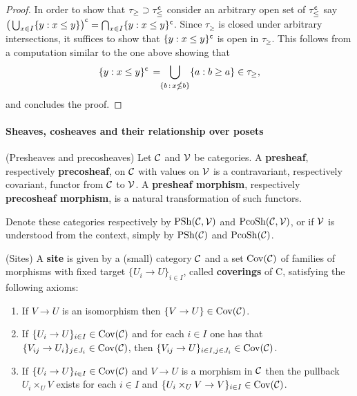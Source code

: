 \documentclass[main.tex]{subfiles}
\begin{document}
\begin{lemma}
\begin{proof}
In order to show that $\tau_\geq\supset\tau_{\leq}^{\mathsf{c}}$ consider an arbitrary open set of $\tau_{\leq}^{\mathsf{c}}$ say $\big(\bigcup_{x\in I}\{y:x\leq y\}\big)^{\mathsf{c}}=\bigcap_{x\in I}\{y:x\leq y\}^{\mathsf{c}}$. Since $\tau_\geq$ is closed under arbitrary intersections, it suffices to show that $\{y:x\leq y\}^{\mathsf{c}}$ is open in $\tau_\geq$. This follows from a computation similar to the one above showing that
\begin{equation*}
\{y:x\leq y\}^\c\,=\!\!\bigcup_{\{b\,:\,x\nleq b\}}\{a:b\geq a\}\in\tau_\geq, \vspace*{-8pt}
\end{equation*}
and concludes the proof.
\end{proof}
\end{lemma}

\paragraph{Sheaves, cosheaves and their relationship over posets}

\begin{definition}(Presheaves and precosheaves)
Let $\operatorname{\mathcal{C}}$ and $\operatorname{\mathcal{V}}$ be categories. A \textbf{presheaf}, respectively \textbf{precosheaf}, on $\operatorname{\mathcal{C}}$ with values on $\operatorname{\mathcal{V}}$ is a
contravariant, respectively covariant, functor from $\operatorname{\mathcal{C}}$ to $\operatorname{\mathcal{V}}$. A \textbf{presheaf morphism}, respectively \textbf{precosheaf morphism}, is a natural transformation of such functors.

Denote these categories respectively by $\operatorname{PSh}(\operatorname{\mathcal{C}},\operatorname{\mathcal{V}})$ and $\operatorname{PcoSh}(\operatorname{\mathcal{C}},\operatorname{\mathcal{V}})$, or if $\operatorname{\mathcal{V}}$ is understood from the context, simply by $\operatorname{PSh}(\operatorname{\mathcal{C}})$ and $\operatorname{PcoSh}(\operatorname{\mathcal{C}})$.
\end{definition}

\begin{definition}(Sites)
A \textbf{site} is given by a (small) category $\operatorname{\mathcal{C}}$ and a set $\operatorname{Cov}(\operatorname{\mathcal{C}})$ of families of
morphisms with fixed target $\{U_i\to U\}_{i\in I}$, called \textbf{coverings} of C, satisfying the
following axioms:
\begin{enumerate}[S1:]
\item If $V\to U$ is an isomorphism then $\{V\to U\}\in\operatorname{Cov}(\operatorname{\mathcal{C}})$.
\item If $\{U_i\to U\}_{i\in I}\in\operatorname{Cov}(\operatorname{\mathcal{C}})$ and for each $i\in I$ one has that $\{V_{ij}\to U_i\}_{j\in J_i}\in\operatorname{Cov}(\operatorname{\mathcal{C}})$,
    then $\{V_{ij}\to U\}_{i\in I, j\in J_i}\in\operatorname{Cov}(\operatorname{\mathcal{C}})$.
\item If $\{U_i\to U\}_{i\in I}\in\operatorname{Cov}(\operatorname{\mathcal{C}})$ and $V\to U$ is a morphism in $\operatorname{\mathcal{C}}$ then the pullback $U_i\times_U V$ exists for each $i\in I$ and $\{U_i\times_U V\to V\}_{i\in I}\in\operatorname{Cov}(\operatorname{\mathcal{C}})$.
\end{enumerate}
\end{definition}
\end{document}
